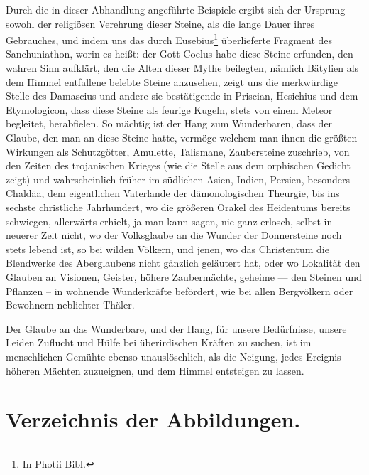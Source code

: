 \documentclass[a4paper, 11pt, oneside, polutonikogreek, german]{article}
\begin{document}
Durch die in dieser Abhandlung angeführte Beispiele ergibt sich der Ursprung sowohl der religiösen Verehrung dieser Steine, als die lange Dauer ihres Gebrauches, und indem uns das durch Eusebius\footnote{In Photii Bibl.} überlieferte Fragment des Sanchuniathon, worin es heißt: der Gott Coelus habe diese Steine erfunden, den wahren Sinn aufklärt, den die Alten dieser Mythe beilegten, nämlich Bätylien als dem Himmel entfallene belebte Steine anzusehen, zeigt uns die merkwürdige Stelle des Damascius und andere sie bestätigende in Priscian, Hesichius und dem Etymologicon, dass diese Steine als feurige Kugeln, stets von einem Meteor begleitet, herabfielen. So mächtig ist der Hang zum Wunderbaren, dass der Glaube, den man an diese Steine hatte, vermöge welchem man ihnen die größten Wirkungen als Schutzgötter, Amulette, Talismane, Zaubersteine zuschrieb, von den Zeiten des trojanischen Krieges (wie die Stelle aus dem orphischen Gedicht zeigt) und wahrscheinlich früher im südlichen Asien, Indien, Persien, besonders Chaldäa, dem eigentlichen Vaterlande der dämonologischen Theurgie, bis ins sechste christliche Jahrhundert, wo die größeren Orakel des Heidentums bereits schwiegen, allerwärts erhielt, ja man kann sagen, nie ganz erlosch, selbst in neuerer Zeit nicht, wo der Volksglaube an die Wunder der Donnersteine noch stets lebend ist, so bei wilden Völkern, und jenen, wo das Christentum die Blendwerke des Aberglaubens nicht gänzlich geläutert hat, oder wo Lokalität den Glauben an Visionen, Geister, höhere Zaubermächte, geheime --- den Steinen und Pflanzen -- in wohnende Wunderkräfte befördert, wie bei allen Bergvölkern oder Bewohnern neblichter Thäler.

Der Glaube an das Wunderbare, und der Hang, für unsere Bedürfnisse, unsere Leiden Zuflucht und Hülfe bei überirdischen Kräften zu suchen, ist im menschlichen Gemühte ebenso unauslöschlich, als die Neigung, jedes Ereignis höheren Mächten zuzueignen, und dem Himmel entsteigen zu lassen.
\clearpage
\section*{Verzeichnis der Abbildungen.}
\end{document}
